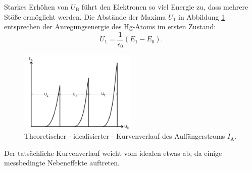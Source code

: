 Starkes Erhöhen von $U_\mathup{B}$ führt den Elektronen so viel Energie zu, dass mehrere Stöße ermöglicht werden. 
Die Abstände der Maxima $U_1$ in Abbildung \ref{fig:id} entsprechen der Anregungsenergie des Hg-Atoms im ersten Zustand:
\begin{equation}
	U_1=\frac{1}{\epsilon_0}{(E_1-E_0)}.
\end{equation}
\begin{figure}
	\centering
	\includegraphics[width=0.5\textwidth]{Bilder/Kurve_Theo.pdf}
	\caption{Theoretischer - idealisierter - Kurvenverlauf des Auffängerstroms $I_\mathup{A}$.}
	\label{fig:id}
\end{figure}
Der tatsächliche Kurvenverlauf weicht vom idealen etwas ab, da einige messbedingte Nebeneffekte auftreten.

